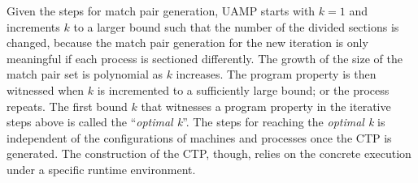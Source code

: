 Given the steps for match pair generation, UAMP starts with $k=1$ and increments $k$ to a larger bound such that the number of the divided sections is changed, because the match pair generation for the new iteration is only meaningful if each process is sectioned differently. The growth of the size of the match pair set is polynomial as $k$ increases. The program property is then witnessed when $k$ is incremented to a sufficiently large bound; or the process repeats.
The first bound $k$ that witnesses a program property in the iterative steps above is called the ``\textit{optimal k}''. 
The steps for reaching the \textit{optimal k} is independent of the configurations of machines and processes once the CTP is generated. The construction of the CTP, though, relies on the concrete execution under a specific runtime environment.  






